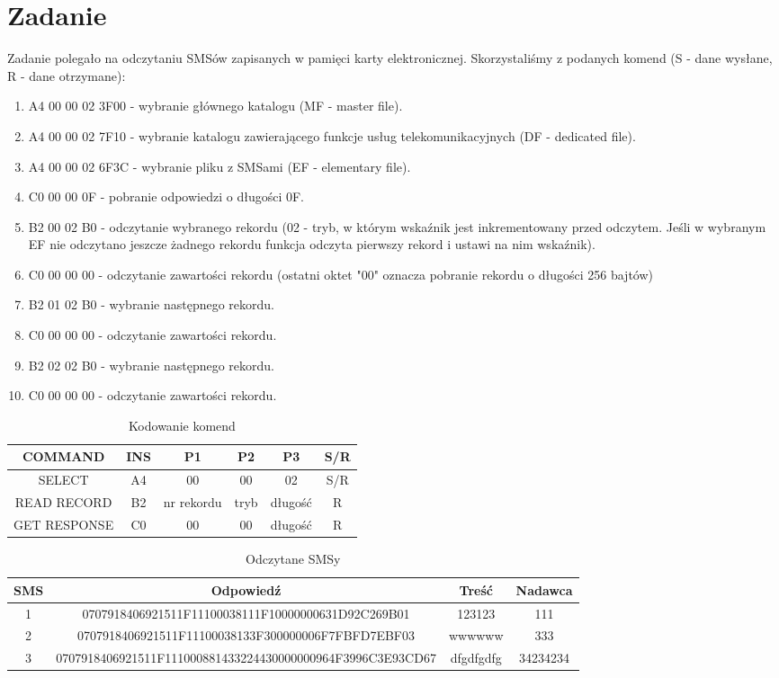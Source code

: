 \documentclass{article}
\begin{document}
\section{Zadanie}
Zadanie polegało na odczytaniu SMSów zapisanych w pamięci karty elektronicznej. Skorzystaliśmy z podanych komend (S - dane wysłane, R - dane otrzymane):
\begin{enumerate}
\item A4 00 00 02 3F00 - wybranie głównego katalogu (MF - master file).
\item A4 00 00 02 7F10 - wybranie katalogu zawierającego funkcje usług telekomunikacyjnych (DF - dedicated file).
\item A4 00 00 02 6F3C - wybranie pliku z SMSami (EF - elementary file).
\item C0 00 00 0F - pobranie odpowiedzi o długości 0F.
\item B2 00 02 B0 - odczytanie wybranego rekordu (02 - tryb, w którym wskaźnik jest inkrementowany przed odczytem. Jeśli w wybranym EF nie odczytano jeszcze żadnego rekordu funkcja odczyta pierwszy rekord i ustawi na nim wskaźnik).
\item C0 00 00 00 - odczytanie zawartości rekordu (ostatni oktet "00" oznacza pobranie rekordu o długości 256 bajtów)
\item B2 01 02 B0 - wybranie następnego rekordu.
\item C0 00 00 00 - odczytanie zawartości rekordu.
\item B2 02 02 B0 - wybranie następnego rekordu.
\item C0 00 00 00 - odczytanie zawartości rekordu.

\end{enumerate}
\begin{table}[ht]
    \centering
    \begin{tabular}{|c|c|c|c|c|c|}
        \hline
        COMMAND & INS & P1 & P2 & P3 & S/R \\
        \hline
        SELECT & A4 & 00 & 00 & 02 & S/R \\
        READ RECORD & B2 & nr rekordu & tryb & długość & R \\
        GET RESPONSE & C0 & 00 & 00 & długość & R \\
        \hline
    \end{tabular}
    \caption{Kodowanie komend}
\end{table}
\newpage
\begin{table}[ht]
    \begin{adjustwidth}{-1in}{-1in}
    \centering
    \begin{tabular}{|c|c|c|c|}
        \hline
        SMS & Odpowiedź & Treść & Nadawca \\
        \hline
        1 & 0707918406921511F11100038111F10000000631D92C269B01 & 123123 & 111 \\
        2 & 0707918406921511F11100038133F300000006F7FBFD7EBF03 & wwwwww & 333 \\
        3 & 0707918406921511F111000881433224430000000964F3996C3E93CD67 & dfgdfgdfg & 34234234 \\
        \hline
    \end{tabular}
    \end{adjustwidth}
    \caption{Odczytane SMSy}
\end{table}
\end{document}
